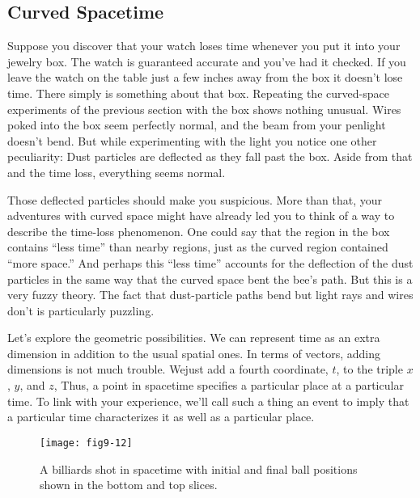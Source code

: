\documentclass{book}
\begin{document}
\subsection{Curved Spacetime}

Suppose you discover that your watch loses time whenever you put it
into your jewelry box. The watch is guaranteed accurate and you've had
it checked. If you leave the watch on the table just a few inches away
from the box it doesn't lose time. There simply is something about that
box. Repeating the curved-space experiments of the previous section
with the box shows nothing unusual. Wires poked into the box seem
perfectly normal, and the beam from your penlight doesn't bend. But
while experimenting with the light you notice one other peculiarity: Dust
particles are deflected as they fall past the box. Aside from that and the
time loss, everything seems normal.

Those deflected particles should make you suspicious. More than that,
your adventures with curved space might have already led you to think
of a way to describe the time-loss phenomenon. One could say that the
region in the box contains ``less time'' than nearby regions, just as the
curved region contained ``more space.'' And perhaps this ``less time''
accounts for the deflection of the dust particles in the same way that
the curved space bent the bee's path. But this is a very fuzzy theory.
The fact that dust-particle paths bend but light rays and wires don't is
particularly puzzling.

Let's explore the geometric possibilities. We can represent time as an
extra dimension in addition to the usual spatial ones. In terms of vectors,
adding dimensions is not much trouble. Wejust add a fourth coordinate,
$t$, to the triple $x$, $y$, and $z$, Thus, a point in spacetime specifies a
particular place at a particular time. To link with your experience, we'll
call such a thing an event to imply that a particular time characterizes
it as well as a particular place.

\begin{figure}
\begin{center}
\texttt{[image: fig9-12]}
\caption{A billiards shot in spacetime with initial and final ball positions shown in the bottom and top slices.}
\end{center}
\end{figure}
\end{document}
